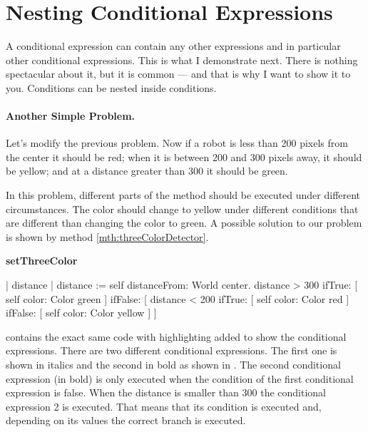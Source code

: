 \section{Nesting Conditional Expressions}
A conditional expression can contain any other expressions and in particular other conditional expressions. This is what I demonstrate next. There is nothing spectacular about it, but it is common --- and that is why I want to show it to you. Conditions can be nested inside conditions.

\paragraph{Another Simple Problem.}
Let's modify the previous problem. Now if a robot is less than 200 pixels from the center it should be red; when it is between 200 and 300 pixels away, it should be yellow; and at a distance greater than 300 it should be green.  %


In this problem, different parts of the method should be executed under different circumstances. The color should change to yellow  under different conditions that are different than changing the color to green. A possible solution to our problem is shown by method \ref{mth:threeColorDetector}. 

\begin{method}\label{mth:threeColorDetector}
\textbf{setThreeColor}

   | distance | 
   distance := self distanceFrom: World  center.
   distance > 300
      ifTrue: [ self color: Color green ]
      ifFalse: [ distance < 200
         ifTrue: [ self color: Color red ]
         ifFalse: [ self color: Color yellow ] ]
\end{method}

 contains the exact same code with highlighting added to show the conditional expressions. There are two different conditional expressions. The first one is shown in italics and the second in bold as shown in . The second conditional expression (in bold) is only executed when the condition of the first conditional expression is false. When the distance is smaller than 300 the conditional expression 2 is executed. That means that its condition is executed and, depending on its values the correct branch is executed. 



